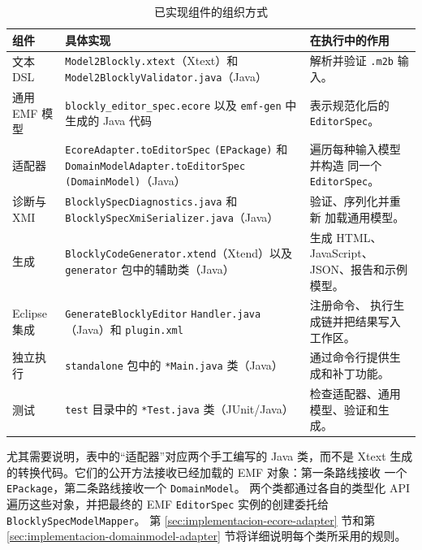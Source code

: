 \begin{table}[H]
  \centering
  \small
  \setlength{\tabcolsep}{4pt}
  \begin{tabular}{@{}
      >{\raggedright\arraybackslash}p{}
      >{\raggedright\arraybackslash}p{}
      >{\raggedright\arraybackslash}p{}@{}}
    \toprule
    组件 & 具体实现 & 在执行中的作用 \\
    \midrule
    文本 DSL & \texttt{Model2Blockly.xtext}（Xtext）和
    \texttt{Model2BlocklyValidator.java}（Java） & 解析并验证
    \texttt{.m2b} 输入。 \\

    通用 EMF 模型 & \texttt{blockly\_editor\_spec.ecore} 以及
    \texttt{emf-gen} 中生成的 Java 代码 & 表示规范化后的
    \texttt{EditorSpec}。 \\

    适配器 & \texttt{EcoreAdapter.}\allowbreak\texttt{toEditorSpec}
    \allowbreak\texttt{(EPackage)} 和
    \texttt{DomainModelAdapter.}\allowbreak\texttt{toEditorSpec}
    \allowbreak\texttt{(DomainModel)}（Java） & 遍历每种输入模型并构造
    同一个 \texttt{EditorSpec}。 \\

    诊断与 XMI & \texttt{BlocklySpecDiagnostics.java} 和
    \texttt{BlocklySpecXmiSerializer.java}（Java） & 验证、序列化并重新
    加载通用模型。 \\

    生成 & \texttt{BlocklyCodeGenerator.xtend}（Xtend）以及
    \texttt{generator} 包中的辅助类（Java） & 生成 HTML、JavaScript、
    JSON、报告和示例模型。 \\

    Eclipse 集成 & \texttt{GenerateBlocklyEditor}\allowbreak
    \texttt{Handler.java}（Java）和 \texttt{plugin.xml} & 注册命令、
    执行生成链并把结果写入工作区。 \\

    独立执行 & \texttt{standalone} 包中的 \texttt{*Main.java} 类（Java） &
    通过命令行提供生成和补丁功能。 \\

    测试 & \texttt{test} 目录中的 \texttt{*Test.java} 类（JUnit/Java） &
    检查适配器、通用模型、验证和生成。 \\
    \bottomrule
  \end{tabular}
  \caption{已实现组件的组织方式}
  \label{tab:paquetes-implementacion}
\end{table}

尤其需要说明，表中的“适配器”对应两个手工编写的 Java 类，而不是 Xtext
生成的转换代码。它们的公开方法接收已经加载的 EMF 对象：第一条路线接收
一个 \texttt{EPackage}，第二条路线接收一个 \texttt{DomainModel}。
两个类都通过各自的类型化 API 遍历这些对象，并把最终的 EMF
\texttt{EditorSpec} 实例的创建委托给 \texttt{BlocklySpecModelMapper}。
第 \ref{sec:implementacion-ecore-adapter} 节和第
\ref{sec:implementacion-domainmodel-adapter} 节将详细说明每个类所采用的规则。

